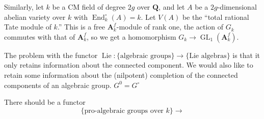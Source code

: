\documentclass{article}
\DeclareMathOperator{\genlin}{GL}
\DeclareMathOperator{\lie}{Lie}
\newcommand{\dA}{\mathbf{A}}
\newcommand{\dQ}{\mathbf{Q}}
\begin{document}
Similarly, let $k$ be a CM field of degree $2 g$ over $\dQ$, and let $A$ be a 
$2 g$-dimensional abelian variety over $k$ with 
$\operatorname{End}_k^\circ(A)=k$. Let $V(A)$ be the ``total rational Tate 
module of $k$.'' This is a free $\dA_k^f$-module of rank one, the action of 
$G_k$ commutes with that of $\dA_k^f$, so we get a homomorphism 
$G_k \to \genlin_1(\dA_k^f)$. 

The problem with the functor 
$\lie:\{\text{algebraic groups}\} \to \{\text{Lie algebras}\}$ is that it only 
retains information about the connected component. We would also like to retain 
some information about the (nilpotent) completion of the connected components 
of an algebraic group. $G^0=G^\circ$

There should be a functor 
\[
  \{\text{pro-algebraic groups over $k$}\} \to 
\]
\end{document}
